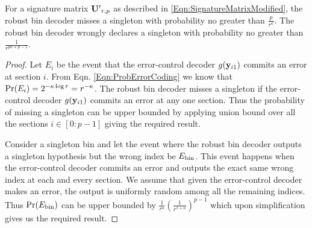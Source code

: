 \begin{lemma}
\label{Lem:RobustBinAnalysis}
For a signature matrix $\mathbf{U'}_{r,p}$ as described in \eqref{Eqn:SignatureMatrixModified}, the robust bin decoder misses a singleton with probability no greater than $\frac{p}{r^{\kappa}}$. The robust bin decoder wrongly declares a singleton with probability no greater than $\frac{1}{r^{p\kappa +p-1}}$.
\end{lemma}
\begin{proof}
Let $E_i$ be the event that the error-control decoder $g(\mathbf{y}_{i1})$ commits an error at section $i$. From Eqn. \eqref{Eqn:ProbErrorCoding} we know that $\text{Pr}(E_i)=2^{-\kappa \log r}=r^{-\kappa}$.
The robust bin decoder misses a singleton if the error-control decoder $g(\mathbf{y}_{i1})$ commits an error at any one section. Thus the probability of missing a singleton can be upper bounded by applying union bound over all the sections $i\in[0:p-1]$ giving the required result. 

Consider a singleton bin and let the event where the robust bin decoder outputs a singleton hypothesis but the wrong index be $E_{\text{bin}}$. This event happens when the error-control decoder commits an error and outputs the exact same wrong index at each and every section. We assume that given the error-control decoder makes an error, the output is uniformly random among all the remaining indices. Thus $\text{Pr}(E_{\text{bin}})$ can be upper bounded by $\frac{1}{r^\kappa} (\frac{1}{r^{1+\kappa}})^{p-1}$ which upon simplification gives us the required result.
\end{proof}

